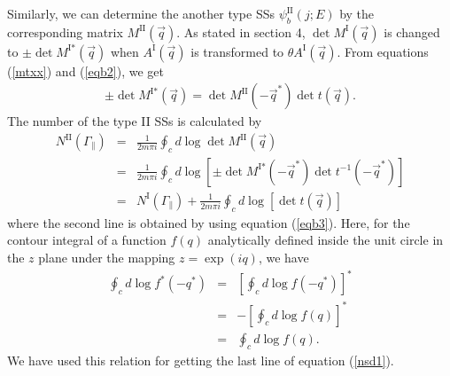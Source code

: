 \documentclass[aps,pra,amsmath,twocolumn,showpacs,bibnotes,10pt]{revtex4-1}
\begin{document}
Similarly, we can determine the another type SSs $\psi^{\text{II}}_b(j;E)$ by the corresponding matrix $M^{\text{II}}({\vec q})$. As stated in section 4, $\det M^{\text{I}}(\vec q)$ is changed to $\pm\det M^{\text{I}\ast}(\vec q)$ when $A^{\text{I}}({\vec q})$ is transformed to $\theta A^{\text{I}}({\vec q})$. From equations (\ref{mtxx}) and (\ref{eqb2}), we get 
\begin{eqnarray}
\pm\det M^{\text{I}\ast}(\vec q) = \det M^{\text{II}}(-\vec q^{\ast})\det t(\vec q). \label{eqb3}
\end{eqnarray}
The number of the type II SSs is calculated by
\begin{eqnarray}
N^{\text{II}}(\Gamma_{\parallel}) &=& \frac{1}{2m\pi i}\oint_{c}d\log \det M^{\text{II}}(\vec q)  \nonumber\\ 
&=& \frac{1}{2m\pi i}\oint_{c}d\log [\pm\det M^{\text{I}\ast}(-\vec q^{\ast})\det t^{-1}(-\vec q^{\ast})]  \nonumber\\  
&=& N^{\text{I}}(\Gamma_{\parallel})+\frac{1}{2m\pi i}\oint_{c}d\log [\det t(\vec q)]   \label{nsd1}
\end{eqnarray}
where the second line is obtained by using equation (\ref{eqb3}). Here, for the contour integral of a function $f(q)$ analytically defined inside the unit circle in the $z$ plane under the mapping $z= \exp(iq)$, we have 
\begin{eqnarray}
\oint_{c}d\log f^{\ast}(-q^{\ast}) &=& [\oint_{c}d\log f(-q^{\ast})]^{\ast}   \nonumber\\
&=& -[\oint_{c}d\log f(q)]^{\ast}   \nonumber\\
 &=& \oint_{c}d\log f(q).   \label{cir}
\end{eqnarray}
We have used this relation for getting the last line of equation (\ref{nsd1}). 
\end{document}
